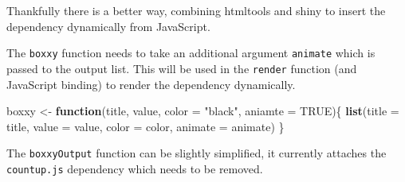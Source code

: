 \documentclass[
]{krantz}
\makeatletter
\newenvironment{Shaded}{\begin{snugshade}}{\end{snugshade}}
\newcommand{\CommentTok}[1]{\textcolor[rgb]{0.37,0.37,0.37}{\textit{#1}}}
\newcommand{\ControlFlowTok}[1]{\textcolor[rgb]{0.27,0.27,0.27}{\textbf{#1}}}
\newcommand{\DataTypeTok}[1]{\textcolor[rgb]{0.27,0.27,0.27}{#1}}
\newcommand{\DecValTok}[1]{\textcolor[rgb]{0.06,0.06,0.06}{#1}}
\newcommand{\KeywordTok}[1]{\textcolor[rgb]{0.27,0.27,0.27}{\textbf{#1}}}
\newcommand{\NormalTok}[1]{#1}
\newcommand{\OperatorTok}[1]{\textcolor[rgb]{0.43,0.43,0.43}{\textbf{#1}}}
\newcommand{\OtherTok}[1]{\textcolor[rgb]{0.37,0.37,0.37}{#1}}
\newcommand{\StringTok}[1]{\textcolor[rgb]{0.5,0.5,0.5}{#1}}
\newenvironment{kframe}{%
\medskip{}
\setlength{\fboxsep}{.8em}
 \def\at@end@of@kframe{}%
 \ifinner\ifhmode%
  \def\at@end@of@kframe{\end{minipage}}%
  \begin{minipage}{\columnwidth}%
 \fi\fi%
 \def\FrameCommand##1{\hskip\@totalleftmargin \hskip-\fboxsep
 \colorbox{shadecolor}{##1}\hskip-\fboxsep
     \hskip-\linewidth \hskip-\@totalleftmargin \hskip\columnwidth}%
 \MakeFramed {\advance\hsize-\width
   \@totalleftmargin\z@ \linewidth\hsize
   \@setminipage}}%
 {\par\unskip\endMakeFramed%
 \at@end@of@kframe}
\renewenvironment{Shaded}{\begin{kframe}}{\end{kframe}}
\makeatother
\begin{document}
\begin{Shaded}
\end{Shaded}

Thankfully there is a better way, combining htmltools and shiny to insert the dependency dynamically from JavaScript.

The \texttt{boxxy} function needs to take an additional argument \texttt{animate} which is passed to the output list. This will be used in the \texttt{render} function (and JavaScript binding) to render the dependency dynamically.

\begin{Shaded}
\begin{Highlighting}[]
\NormalTok{boxxy <{-}}\StringTok{ }\ControlFlowTok{function}\NormalTok{(title, value, }\DataTypeTok{color =} \StringTok{"black"}\NormalTok{, }\DataTypeTok{aniamte =} \OtherTok{TRUE}\NormalTok{)\{}
  \KeywordTok{list}\NormalTok{(}\DataTypeTok{title =}\NormalTok{ title, }\DataTypeTok{value =}\NormalTok{ value, }\DataTypeTok{color =}\NormalTok{ color, }\DataTypeTok{animate =}\NormalTok{ animate)}
\NormalTok{\}}
\end{Highlighting}
\end{Shaded}

The \texttt{boxxyOutput} function can be slightly simplified, it currently attaches the \texttt{countup.js} dependency which needs to be removed.
\end{document}
